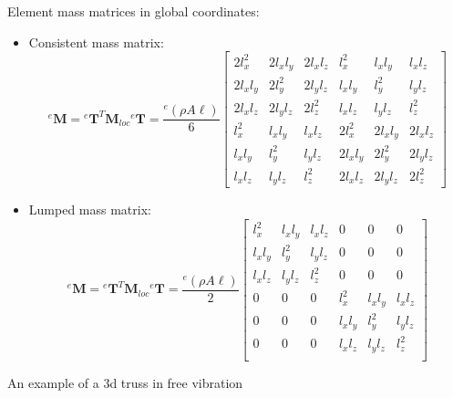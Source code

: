 \documentclass[aspectratio=169]{beamer}
\begin{document}
\begin{frame}{Element mass matrices in global coordinates:}
  \begin{itemize}
    \item Consistent mass matrix:
          $$
            {}^e\mathbf{M}= {}^e\mathbf T^T \mathbf{M}_{loc} {}^e\mathbf T=\frac{{}^e(\rho A\ell)}{6}
            \begin{bmatrix}
              2l_x^2   & 2l_x l_y & 2l_x l_z & l_x^2    & l_x l_y  & l_x l_z  \\
              2l_x l_y & 2l_y^2   & 2l_y l_z & l_x l_y  & l_y^2    & l_y l_z  \\
              2l_x l_z & 2l_y l_z & 2l_z^2   & l_x l_z  & l_y l_z  & l_z^2    \\
              l_x^2    & l_x l_y  & l_x l_z  & 2l_x^2   & 2l_x l_y & 2l_x l_z \\
              l_x l_y  & l_y^2    & l_y l_z  & 2l_x l_y & 2l_y^2   & 2l_y l_z \\
              l_x l_z  & l_y l_z  & l_z^2    & 2l_x l_z & 2l_y l_z & 2l_z^2
            \end{bmatrix}
          $$
    \item Lumped mass matrix:
          $$
            {}^e\mathbf{M}= {}^e\mathbf T^T \mathbf{M}_{loc} {}^e\mathbf T=\frac{{}^e(\rho A\ell)}{2}
            \begin{bmatrix}
              l_x^2   & l_x l_y & l_x l_z & 0       & 0       & 0       \\
              l_x l_y & l_y^2   & l_y l_z & 0       & 0       & 0       \\
              l_x l_z & l_y l_z & l_z^2   & 0       & 0       & 0       \\
              0       & 0       & 0       & l_x^2   & l_x l_y & l_x l_z \\
              0       & 0       & 0       & l_x l_y & l_y^2   & l_y l_z \\
              0       & 0       & 0       & l_x l_z & l_y l_z & l_z^2   \\
            \end{bmatrix}
          $$
  \end{itemize}
\end{frame}

\begin{frame}{An example of a 3d truss in free vibration}
  \begin{center}
    \href{https://drive.mathworks.com/sharing/6a9792ef-d0a7-4aca-a1d0-8b1862b0ac3b}{}
  \end{center}
\end{frame}
\end{document}
